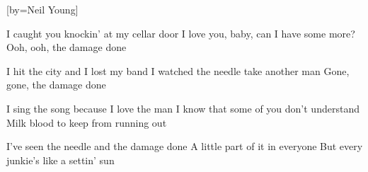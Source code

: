  

[by=Neil Young]




\beginverse
I caught you knockin' at my cellar door
I love you, baby, can I have some more?
Ooh, ooh, the damage done
\endverse

\beginverse
I hit the city and I lost my band
I watched the needle take another man
Gone, gone, the damage done
\endverse

\beginverse
I sing the song because I love the man
I know that some of you don't understand
Milk blood to keep from running out
\endverse

\beginverse
I've seen the needle and the damage done
A little part of it in everyone
But every junkie's like a settin' sun
\endverse

\endsong
